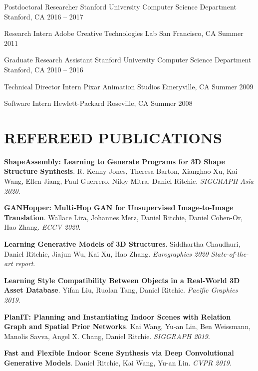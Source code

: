 \documentclass[line,margin]{res}
\begin{document}
\begin{resume}
\job
{Postdoctoral Researcher}
{Stanford University Computer Science Department}
{Stanford, CA}
{2016 -- 2017}

\job
{Research Intern}
{Adobe Creative Technologies Lab}
{San Francisco, CA}
{Summer 2011}

\job
{Graduate Research Assistant}
{Stanford University Computer Science Department}
{Stanford, CA}
{2010 -- 2016}

\job
{Technical Director Intern}
{Pixar Animation Studios}
{Emeryville, CA}
{Summer 2009}

\job
{Software Intern}
{Hewlett-Packard}
{Roseville, CA}
{Summer 2008}


\section{REFEREED PUBLICATIONS}

\newcommand{\pubtitle}[1]{\textbf{#1}}
\newcommand{\pubauthors}[1]{#1}
\newcommand{\pubvenue}[1]{\emph{#1}}
\newcommand{\pubaward}[1]{\textsc{#1}}

\pubtitle{ShapeAssembly: Learning to Generate Programs for 3D Shape Structure Synthesis}.
\pubauthors{R. Kenny Jones, Theresa Barton, Xianghao Xu, Kai Wang, Ellen Jiang, Paul Guerrero, Niloy Mitra, Daniel Ritchie.}
\pubvenue{SIGGRAPH Asia 2020}.

\pubtitle{GANHopper: Multi-Hop GAN for Unsupervised Image-to-Image Translation}. 
\pubauthors{Wallace Lira, Johannes Merz, Daniel Ritchie, Daniel Cohen-Or, Hao Zhang.}
\pubvenue{ECCV 2020}.

\pubtitle{Learning Generative Models of 3D Structures}. 
\pubauthors{Siddhartha Chaudhuri, Daniel Ritchie, Jiajun Wu, Kai Xu, Hao Zhang.}
\pubvenue{{Eurographics} 2020 State-of-the-art report}.

\pubtitle{Learning Style Compatibility Between Objects in a Real-World 3D Asset Database}. 
\pubauthors{Yifan Liu, Ruolan Tang, Daniel Ritchie.}
\pubvenue{{Pacific Graphics} 2019}.

\pubtitle{PlanIT: Planning and Instantiating Indoor Scenes with Relation Graph and Spatial Prior Networks}. 
\pubauthors{Kai Wang, Yu-an Lin, Ben Weissmann, Manolis Savva, Angel X. Chang, Daniel Ritchie.}
\pubvenue{SIGGRAPH 2019}.

\pubtitle{Fast and Flexible Indoor Scene Synthesis via Deep Convolutional Generative Models}. 
\pubauthors{Daniel Ritchie, Kai Wang, Yu-an Lin.}
\pubvenue{CVPR 2019}.


\end{resume}
\end{document}
